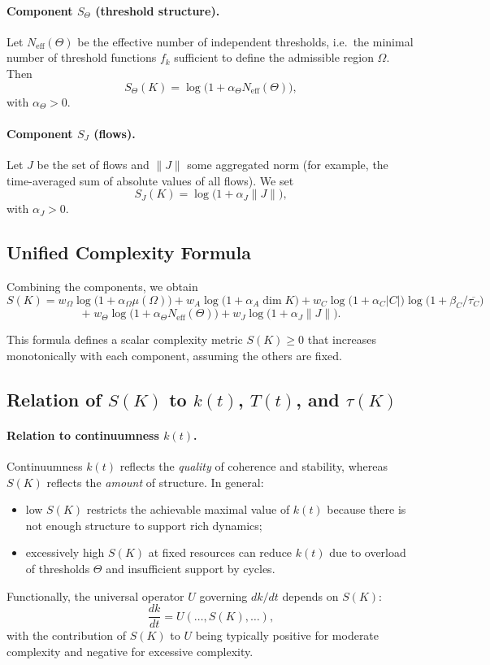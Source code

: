 \paragraph{Component \texorpdfstring{\(S_\Theta\)}{S_\Theta} (threshold structure).}
Let \(N_{\mathrm{eff}}(\Theta)\) be the effective number of independent thresholds, i.e.\ the minimal number of threshold functions \(f_k\) sufficient to define the admissible region \(\Omega\).
Then
\[
  S_\Theta(K) = \log\bigl(1+\alpha_\Theta N_{\mathrm{eff}}(\Theta)\bigr),
\]
with \(\alpha_\Theta>0\).

\paragraph{Component \texorpdfstring{\(S_J\)}{S_J} (flows).}
Let \(J\) be the set of flows and \(\|J\|\) some aggregated norm (for example, the time-averaged sum of absolute values of all flows).
We set
\[
  S_J(K) = \log\bigl(1+\alpha_J \|J\|\bigr),
\]
with \(\alpha_J>0\).

\subsection{Unified Complexity Formula}

Combining the components, we obtain
\begin{equation}
  S(K) =
  w_\Omega \log\bigl(1+\alpha_\Omega \mu(\Omega)\bigr)
  + w_A \log\bigl(1+\alpha_A \dim K\bigr)
  + w_C \log\bigl(1+\alpha_C |C|\bigr)\log\bigl(1+\beta_C/\overline{\tau_C}\bigr)
\end{equation}
\[
  +\; w_\Theta \log\bigl(1+\alpha_\Theta N_{\mathrm{eff}}(\Theta)\bigr)
  + w_J \log\bigl(1+\alpha_J \|J\|\bigr).
\]

This formula defines a scalar complexity metric \(S(K)\ge 0\) that increases monotonically with each component, assuming the others are fixed.

\subsection{Relation of \(S(K)\) to \(k(t)\), \(T(t)\), and \(\tau(K)\)}

\paragraph{Relation to continuumness \(k(t)\).}
Continuumness \(k(t)\) reflects the \emph{quality} of coherence and stability, whereas \(S(K)\) reflects the \emph{amount} of structure.
In general:
\begin{itemize}
  \item low \(S(K)\) restricts the achievable maximal value of \(k(t)\) because there is not enough structure to support rich dynamics;
  \item excessively high \(S(K)\) at fixed resources can reduce \(k(t)\) due to overload of thresholds \(\Theta\) and insufficient support by cycles.
\end{itemize}
Functionally, the universal operator \(U\) governing \(dk/dt\) depends on \(S(K)\):
\[
  \frac{dk}{dt} = U(\ldots,S(K),\ldots),
\]
with the contribution of \(S(K)\) to \(U\) being typically positive for moderate complexity and negative for excessive complexity.

